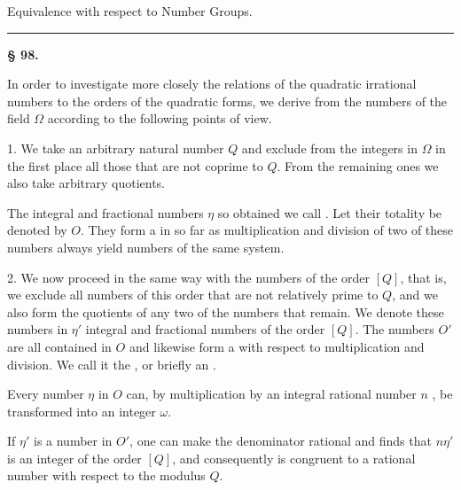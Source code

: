 
\begin{center}

Equivalence with respect to Number Groups.
\end{center}

\rule{0.3\textwidth}{0.4pt}

\begin{center}
\textbf{§ 98. }
\end{center}

In order to investigate more closely the relations of the quadratic
irrational numbers to the orders of the quadratic forms, we derive
from the numbers of the field $\Omega$  according to
the following points of view.

1. We take an arbitrary natural number $Q$ and exclude from the
integers in $\Omega$ in the first place all those that are not coprime
to $Q$. From the remaining ones we also take arbitrary
quotients.

The integral and fractional numbers $\eta$ so obtained we call
. Let their totality be denoted by $O$. They
form a  in so far as multiplication and division
of two of these numbers always yield numbers of the same system.

2. We now proceed in the same way with the numbers of the order $[Q]$,
that is, we exclude all numbers of this order that are not
relatively prime to $Q$, and we also form the quotients
of any two of the numbers that remain. We denote
these numbers in $\eta'$ %
integral and fractional numbers of the order $[Q]$. The numbers $O'$
are all contained in $O$ and likewise form a  with respect to
multiplication and division. We call it the
, or briefly an .

Every number $\eta$ in $O$ can, by multiplication by an integral
rational number $n$ , be transformed into an integer $\omega$.

If $\eta'$ is a number in $O'$, one can make the denominator
rational and finds that $n\eta'$ is an integer of the order
$[Q]$, and consequently is congruent to a rational number with respect to
the modulus $Q$.
